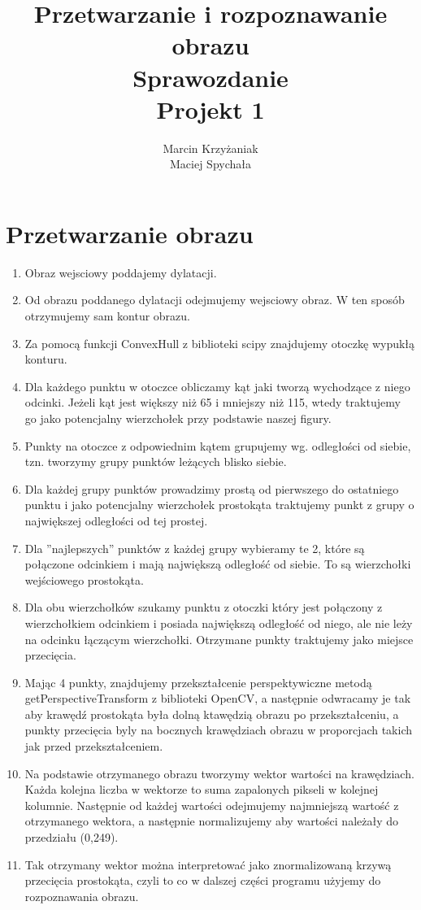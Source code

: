 \documentclass[a4paper,11pt]{article}
\author{Marcin Krzyżaniak  \\ Maciej Spychała}
\title{Przetwarzanie i rozpoznawanie obrazu\\ 
\large{{\bf Sprawozdanie} \\ Projekt 1}}
\begin{document}
\maketitle 

\section{Przetwarzanie obrazu}
\begin{enumerate}
\item Obraz wejsciowy poddajemy dylatacji.
\item Od obrazu poddanego dylatacji odejmujemy wejsciowy obraz. W ten sposób otrzymujemy sam kontur obrazu.
\item Za pomocą funkcji ConvexHull z biblioteki scipy znajdujemy otoczkę wypukłą konturu.
\item Dla każdego punktu w otoczce obliczamy kąt jaki tworzą wychodzące z niego odcinki. Jeżeli kąt jest większy niż 65 i mniejszy niż 115, wtedy traktujemy go jako potencjalny wierzchołek przy podstawie naszej figury.
\item Punkty na otoczce z odpowiednim kątem grupujemy wg. odległości od siebie, tzn. tworzymy grupy punktów leżących blisko siebie.
\item Dla każdej grupy punktów prowadzimy prostą od pierwszego do ostatniego punktu i jako potencjalny wierzchołek prostokąta traktujemy punkt z grupy o największej odległości od tej prostej.
\item Dla ''najlepszych'' punktów z każdej grupy wybieramy te 2, które są połączone odcinkiem i mają największą odległość od siebie. To są wierzchołki wejściowego prostokąta.
\item Dla obu wierzchołków szukamy punktu z otoczki który jest połączony z wierzchołkiem odcinkiem i posiada największą odległość od niego, ale nie leży na odcinku łączącym wierzchołki. Otrzymane punkty traktujemy jako miejsce przecięcia.
\item Mając 4 punkty, znajdujemy przekształcenie perspektywiczne metodą getPerspectiveTransform z biblioteki OpenCV, a następnie odwracamy je tak aby krawędź prostokąta była dolną ktawędzią obrazu po przekształceniu, a punkty przecięcia byly na bocznych krawędziach obrazu w proporcjach takich jak przed przekształceniem.
\item Na podstawie otrzymanego obrazu tworzymy wektor wartości na krawędziach. Każda kolejna liczba w wektorze to suma zapalonych pikseli w kolejnej kolumnie. Następnie od każdej wartości odejmujemy najmniejszą wartość z otrzymanego wektora, a następnie normalizujemy aby wartości należały do przedziału  (0,249).
\item Tak otrzymany wektor można interpretować jako znormalizowaną krzywą przecięcia prostokąta, czyli to co w dalszej części programu użyjemy do rozpoznawania obrazu.
\end{enumerate}
\end{document}
